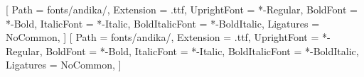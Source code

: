 %

\usetikzlibrary{calc}

\setmainfont{Andika}[
  Path = fonts/andika/,
  Extension = .ttf,
  UprightFont = *-Regular,
  BoldFont = *-Bold,
  ItalicFont = *-Italic,
  BoldItalicFont = *-BoldItalic,
  Ligatures = NoCommon,
]
\setsansfont{Andika}[
  Path = fonts/andika/,
  Extension = .ttf,
  UprightFont = *-Regular,
  BoldFont = *-Bold,
  ItalicFont = *-Italic,
  BoldItalicFont = *-BoldItalic,
  Ligatures = NoCommon,
]


\newcommand{\botonPunto}[1]{%
  \fill[colorLectura] ($(#1.base)+(0,-0.36em)$) circle (0.075em);}
\newcommand{\botonRaya}[1]{%
  \draw[colorLectura, line width=0.06em, line cap=round]
    ($(#1.base west)+(0.12em,-0.36em)$) -- ($(#1.base east)+(-0.12em,-0.36em)$);}
\newcommand{\botonArco}[2]{%
  \draw[colorLectura, line width=0.06em, line cap=round]
    ($(#1.base)+(0,-0.3em)$) .. controls +(0.05em,-0.42em) and +(-0.05em,-0.42em)
    .. ($(#2.base)+(0,-0.3em)$);}

